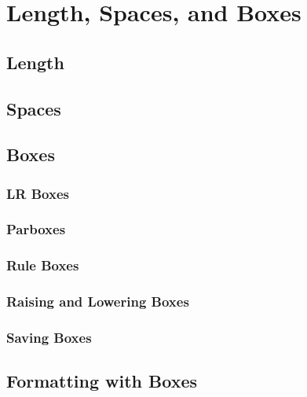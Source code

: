 \section{Length, Spaces, and Boxes}
\subsection{Length}


\subsection{Spaces}


\subsection{Boxes}
\subsubsection{LR Boxes}
\subsubsection{Parboxes}
\subsubsection{Rule Boxes}
\subsubsection{Raising and Lowering Boxes}
\subsubsection{Saving Boxes}


\subsection{Formatting with Boxes}